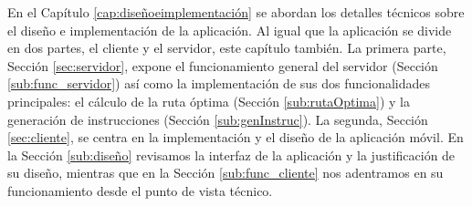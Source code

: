 En el Capítulo \ref{cap:diseñoeimplementación} se abordan los detalles técnicos sobre el diseño e implementación de la aplicación. Al igual que la aplicación se divide en dos partes, el cliente y el servidor, este capítulo también. La primera parte, Sección \ref{sec:servidor}, expone el funcionamiento general del servidor (Sección \ref{sub:func_servidor}) así como la implementación de sus dos funcionalidades principales: el cálculo de la ruta óptima (Sección \ref{sub:rutaOptima}) y la generación de instrucciones (Sección \ref{sub:genInstruc}). La segunda, Sección \ref{sec:cliente}, se centra en la implementación y el diseño de la aplicación móvil. En la Sección \ref{sub:diseño} revisamos la interfaz de la aplicación y la justificación de su diseño, mientras que en la Sección \ref{sub:func_cliente} nos adentramos en su funcionamiento desde el punto de vista técnico.



